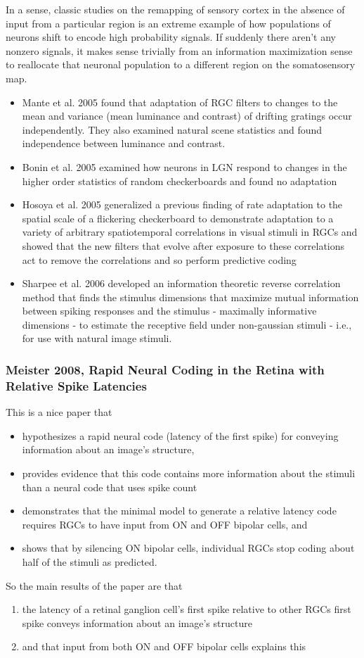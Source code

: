 \documentclass{article}
\begin{document}
In a sense, classic studies on the remapping of sensory cortex in the absence of input from a particular region is an extreme example of how populations of neurons shift to encode high probability signals.  If suddenly there aren't any nonzero signals, it makes sense trivially from an information maximization sense to reallocate that neuronal population to a different region on the somatosensory map.
\begin{itemize}
\item Mante et al. 2005 found that adaptation of RGC filters to changes to the mean and variance (mean luminance and contrast) of drifting gratings occur independently.  They also examined natural scene statistics and found independence between luminance and contrast.
\item Bonin et al. 2005 examined how neurons in LGN respond to changes in the higher order statistics of random checkerboards and found no adaptation
\item Hosoya et al. 2005 generalized a previous finding of rate adaptation to the spatial scale of a flickering checkerboard to demonstrate adaptation to a variety of arbitrary spatiotemporal correlations in visual stimuli in RGCs and showed that the new filters that evolve after exposure to these correlations act to remove the correlations and so perform predictive coding
\item Sharpee et al. 2006 developed an information theoretic reverse correlation method that finds the stimulus dimensions that maximize mutual information between spiking responses and the stimulus - maximally informative dimensions - to estimate the receptive field under non-gaussian stimuli - i.e., for use with natural image stimuli.
\end{itemize}


\subsubsection{Meister 2008, Rapid Neural Coding in the Retina with Relative Spike Latencies}
This is a nice paper that 
\begin{itemize}
\item hypothesizes a rapid neural code (latency of the first spike) for conveying information about an image's structure,
\item provides evidence that this code contains more information about the stimuli than a neural code that uses spike count
\item demonstrates that the minimal model to generate a relative latency code requires RGCs to have input from ON and OFF bipolar cells, and
\item shows that by silencing ON bipolar cells, individual RGCs stop coding about half of the stimuli as predicted.
\end{itemize}
So the main results of the paper are that
\begin{enumerate}
\item the latency of a retinal ganglion cell's first spike relative to other RGCs first spike conveys information about an image's structure
\item and that input from both ON and OFF bipolar cells explains this
\end{enumerate}
\end{document}
